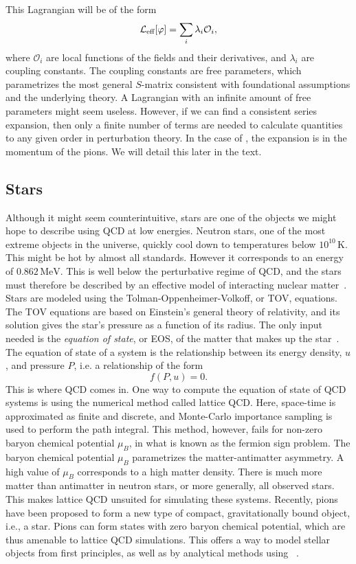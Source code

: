 This Lagrangian will be of the form
\begin{equation}
    \mathcal{L}_\text{eff}[\varphi] = \sum_i \lambda_i \mathcal O_i,
\end{equation}
where $\mathcal O_i$ are local functions of the fields and their derivatives, and $\lambda_i$ are coupling constants.
The coupling constants are free parameters, which parametrizes the most general $S$-matrix consistent with foundational assumptions and the underlying theory.
A Lagrangian with an infinite amount of free parameters might seem useless.
However, if we can find a consistent series expansion, then only a finite number of terms are needed to calculate quantities to any given order in perturbation theory.
In the case of \chpt, the expansion is in the momentum of the pions.
We will detail this later in the text.


\subsection*{Stars}

Although it might seem counterintuitive, stars are one of the objects we might hope to describe using QCD at low energies.
Neutron stars, one of the most extreme objects in the universe, quickly cool down to temperatures below $10^{10} \, \text{K}$.
This might be hot by almost all standards.
However it corresponds to an energy of $0.862 \, \text{MeV}$.
This is well below the perturbative regime of QCD, and the stars must therefore be described by an effective model of interacting nuclear matter~\cite{glendenning:compcat_stars,from_hadrons_to_quarks}.
Stars are modeled using the Tolman-Oppenheimer-Volkoff, or TOV, equations.
The TOV equations are based on Einstein's general theory of relativity, and its solution gives the star's pressure as a function of its radius.
The only input needed is the \emph{equation of state}, or EOS, of the matter that makes up the star~\cite{Carroll:space-time}.
The equation of state of a system is the relationship between its energy density, $u$, and pressure $P$, i.e. a relationship of the form
\begin{equation}
    f(P, u) = 0.
\end{equation}
This is where QCD comes in.
One way to compute the equation of state of QCD systems is using the numerical method called lattice QCD.
Here, space-time is approximated as finite and discrete, and Monte-Carlo importance sampling is used to perform the path integral.
This method, however, fails for non-zero baryon chemical potential $\mu_B$, in what is known as the fermion sign problem.
The baryon chemical potential $\mu_B$ parametrizes the matter-antimatter asymmetry.
A high value of $\mu_B$ corresponds to a high matter density.
There is much more matter than antimatter in neutron stars, or more generally, all observed stars.
This makes lattice QCD unsuited for simulating these systems.
Recently, pions have been proposed to form a new type of compact, gravitationally bound object, i.e., a star.
Pions can form states with zero baryon chemical potential, which are thus amenable to lattice QCD simulations.
This offers a way to model stellar objects from first principles, as well as by analytical methods using \chpt~\cite{new_clas_of_compact_stars,andersen:bose_einstein}.

